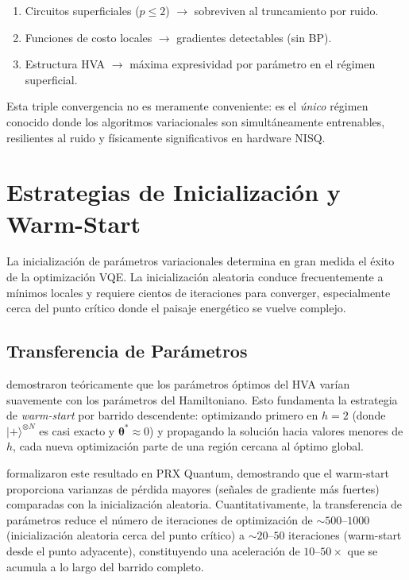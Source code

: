 \documentclass[11pt,a4paper,spanish]{book}
\begin{document}
\begin{enumerate}
    \item Circuitos superficiales ($p \leq 2$) $\to$ sobreviven al truncamiento por ruido.
    \item Funciones de costo locales $\to$ gradientes detectables (sin BP).
    \item Estructura HVA $\to$ máxima expresividad por parámetro en el régimen superficial.
\end{enumerate}

Esta triple convergencia no es meramente conveniente: es el \emph{único} régimen conocido donde los algoritmos variacionales son simultáneamente entrenables, resilientes al ruido y físicamente significativos en hardware NISQ.

\section{Estrategias de Inicialización y Warm-Start}

La inicialización de parámetros variacionales determina en gran medida el éxito de la optimización VQE. La inicialización aleatoria conduce frecuentemente a mínimos locales y requiere cientos de iteraciones para converger, especialmente cerca del punto crítico donde el paisaje energético se vuelve complejo.

\subsection{Transferencia de Parámetros}

\citet{mele2022} demostraron teóricamente que los parámetros óptimos del HVA varían suavemente con los parámetros del Hamiltoniano. Esto fundamenta la estrategia de \emph{warm-start} por barrido descendente: optimizando primero en $h = 2$ (donde $|+\rangle^{\otimes N}$ es casi exacto y $\boldsymbol{\theta}^* \approx 0$) y propagando la solución hacia valores menores de $h$, cada nueva optimización parte de una región cercana al óptimo global.

\citet{puig2025} formalizaron este resultado en PRX Quantum, demostrando que el warm-start proporciona varianzas de pérdida mayores (señales de gradiente más fuertes) comparadas con la inicialización aleatoria. Cuantitativamente, la transferencia de parámetros reduce el número de iteraciones de optimización de $\sim 500$--$1000$ (inicialización aleatoria cerca del punto crítico) a $\sim 20$--$50$ iteraciones (warm-start desde el punto adyacente), constituyendo una aceleración de $10$--$50\times$ que se acumula a lo largo del barrido completo.
\end{document}
